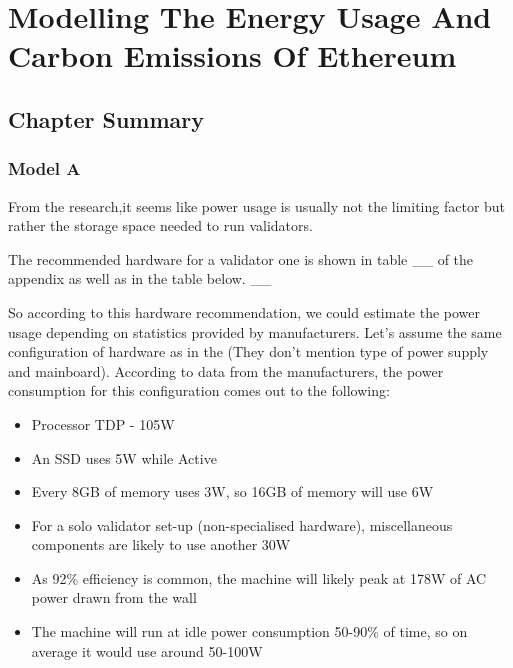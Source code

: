 \chapter{Modelling The Energy Usage And Carbon Emissions Of Ethereum}
\label{Modelling}

\section{Chapter Summary}



\subsection{Model A}
From the research,it seems like power usage is usually not the limiting factor but rather the storage space needed to run validators.

The recommended hardware for a validator one is shown in table \_\_ of the appendix as well as in the table below. \_\_

So according to this hardware recommendation, we could estimate the power usage depending on statistics provided by manufacturers. Let's assume the same configuration of hardware as in the \cite{CCRI:Network} (They don't mention type of power supply and mainboard).  According to data from the manufacturers, the power consumption for this configuration comes out to the following: 

\begin{itemize}
    \item Processor TDP - 105W
    
    \item An SSD uses 5W while Active
    
    \item Every 8GB of memory uses 3W, so 16GB of memory will use 6W
    
    \item For a solo validator set-up (non-specialised hardware), miscellaneous components are likely to use another 30W
    
    \item As 92\% efficiency is common, the machine will likely peak at 178W of AC power drawn from the wall
    
    \item The machine will run at idle power consumption 50-90\% of time, so on average it would use around 50-100W
    
\end{itemize}

